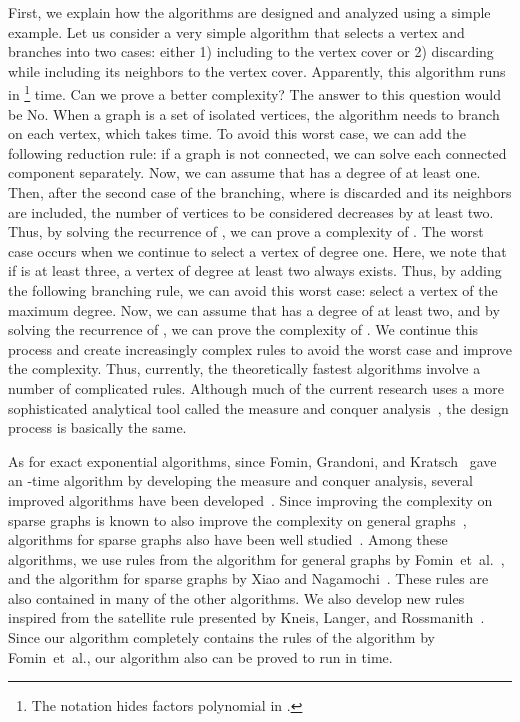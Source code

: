 \documentclass[11pt]{article}
\begin{document}
First, we explain how the algorithms are designed and analyzed using a simple example.
Let us consider a very simple algorithm that selects a vertex  and branches into two cases: either 1) including  to the
vertex cover or 2) discarding  while including its neighbors to the vertex cover.
Apparently, this algorithm runs in \footnote{The  notation hides factors polynomial in .} time.
Can we prove a better complexity?
The answer to this question would be No.
When a graph is a set of  isolated vertices, the algorithm needs to branch on each vertex, which takes
 time.
To avoid this worst case, we can add the following reduction rule: if a graph is not connected, we can solve each
connected component separately.
Now, we can assume that  has a degree of at least one.
Then, after the second case of the branching, where  is discarded and its neighbors are included, the number of
vertices to be considered decreases by at least two.
Thus, by solving the recurrence of , we can prove a complexity of .
The worst case occurs when we continue to select a vertex of degree one.
Here, we note that if  is at least three, a vertex of degree at least two always exists.
Thus, by adding the following branching rule, we can avoid this worst case: select a vertex of the maximum degree.
Now, we can assume that  has a degree of at least two, and by solving the recurrence of , we can
prove the complexity of .
We continue this process and create increasingly complex rules to avoid the worst case and improve the complexity.
Thus, currently, the theoretically fastest algorithms involve a number of complicated rules.
Although much of the current research uses a more sophisticated analytical tool called the measure and conquer
analysis~\cite{vc_reduction/measure_and_conquer},
the design process is basically the same.

As for exact exponential algorithms,
since Fomin, Grandoni, and Kratsch~\cite{vc_reduction/measure_and_conquer} gave an -time algorithm by
developing the measure and conquer analysis, several improved algorithms have been
developed~\cite{DBLP:conf/fsttcs/KneisLR09,DBLP:journals/algorithmica/BourgeoisEPR12,DBLP:conf/isaac/XiaoN13}.
Since improving the complexity on sparse graphs is known to also improve the
complexity on general graphs~\cite{DBLP:journals/algorithmica/BourgeoisEPR12}, algorithms for sparse graphs also have
been well studied~\cite{DBLP:journals/jda/Razgon09,DBLP:journals/algorithmica/BourgeoisEPR12,DBLP:conf/isaac/XiaoN13}.
Among these algorithms, we use rules from the algorithm for general graphs by
Fomin~et~al.~\cite{vc_reduction/measure_and_conquer}, and the algorithm for sparse graphs by Xiao and
Nagamochi~\cite{DBLP:conf/isaac/XiaoN13}.
These rules are also contained in many of the other algorithms.
We also develop new rules inspired from the satellite rule presented by
Kneis, Langer, and Rossmanith~\cite{DBLP:conf/fsttcs/KneisLR09}.
Since our algorithm completely contains the rules of the algorithm by Fomin~et~al., our algorithm also can be proved to
run in  time.
\end{document}
